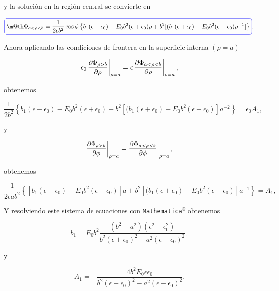\documentclass[a4paper,11pt]{article}
\makeatletter
\numberwithin{equation}{section}
\newcommand{\zerodel}{.\kern-\nulldelimiterspace}
\newcommand*{\boxcolor}{blue}
\renewcommand{\boxed}[1]{\textcolor{\boxcolor}{%
\tikz[baseline={([yshift=-1ex]current bounding box.center)}] \node [rectangle, minimum width=1ex,rounded corners,draw] {\normalcolor\m@th$\displaystyle#1$};}}
\makeatother
\begin{document}
y la solución en la región central se convierte en 

\begin{equation*}
 \boxed{\Phi_{a < \rho < b} = \frac{1}{2\epsilon b^2}\cos{\phi}\left\{
 b_1(\epsilon - \epsilon_0) - E_0 b^2 (\epsilon + \epsilon_0)\rho 
 + b^2[(b_1(\epsilon+\epsilon_0) - E_0 b^2(\epsilon - \epsilon_0)\rho^{-1}]\right\}}.
\end{equation*}

Ahora aplicando las condiciones de frontera en la superficie interna $(\rho = a)$ 

\begin{equation}
  \epsilon_0 \left\zerodel\frac{\partial \Phi_{\rho>b}}{\partial \rho}\right|_{\rho=a} = 
 \epsilon \left\zerodel\frac{\partial \Phi_{a < \rho < b}}{\partial \rho}\right|_{\rho=a},
\end{equation}

obtenemos 

\begin{equation}
 \frac{1}{2b^2}\left\{
 b_1(\epsilon - \epsilon_0) - E_0 b^2 (\epsilon + \epsilon_0) 
 + b^2[(b_1(\epsilon+\epsilon_0) - E_0 b^2(\epsilon - \epsilon_0)]a^{-2}\right\} = 
 \epsilon_0 A_1,
\end{equation}

y 

\begin{equation}
 \left\zerodel\frac{\partial \Phi_{\rho>b}}{\partial \phi}\right|_{\rho=a} = 
 \left\zerodel\frac{\partial \Phi_{a < \rho < b}}{\partial \phi}\right|_{\rho=a},
\end{equation}

obtenemos 

\begin{equation}
 \frac{1}{2\epsilon a b^2}\left\{
 [b_1(\epsilon - \epsilon_0) - E_0 b^2 (\epsilon + \epsilon_0)]a 
 + b^2[(b_1(\epsilon+\epsilon_0) - E_0 b^2(\epsilon - \epsilon_0)]a^{-1}\right\} = 
 A_1,
\end{equation}

Y resolviendo este sistema de ecuaciones con \texttt{Mathematica$^\circledR$} obtenemos 

\begin{equation}
 b_1 = E_0 b^2 \frac{(b^2 - a^2)(\epsilon^2 - \epsilon_0^2)}{b^2(\epsilon + 
 \epsilon_0)^2 - a^2(\epsilon - \epsilon_0)^2}, 
\end{equation}

y 

\begin{equation}
 A_1 = - \frac{4b^2 E_0 \epsilon \epsilon_0}{b^2(\epsilon + \epsilon_0)^2 
 - a^2(\epsilon - \epsilon_0)^2}.
\end{equation}
\end{document}
